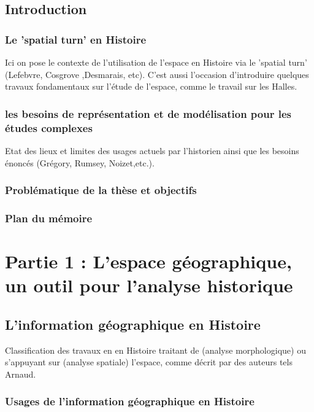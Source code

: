 \documentclass[a4paper,10pt]{article}
\title{}
\author{}
\begin{document}
\maketitle

\begin{abstract}
\end{abstract}

\tableofcontents

\subsection{Introduction}
\subsubsection{Le 'spatial turn' en Histoire}
Ici on pose le contexte de l'utilisation de l'espace en Histoire via le 'spatial turn' (Lefebvre, Cosgrove ,Desmarais, etc).
C'est aussi l'occasion d'introduire quelques travaux fondamentaux sur l'étude de l'espace, comme le travail sur les Halles.
\subsubsection{les besoins de représentation et de modélisation pour les études complexes}
Etat des lieux et limites des usages actuels par l'historien ainsi que les besoins énoncés (Grégory, Rumsey, Noizet,etc.).
\subsubsection{Problématique de la thèse et objectifs}
\subsubsection{Plan du mémoire}


\section{Partie 1 : L'espace géographique, un outil pour l'analyse historique}
\subsection{L'information géographique en Histoire}
Classification des travaux en en Histoire traitant de (analyse morphologique) ou s'appuyant sur (analyse spatiale) l'espace, 
comme décrit par des auteurs tels Arnaud.
\subsubsection{Usages de l'information géographique en Histoire}
\end{document}
